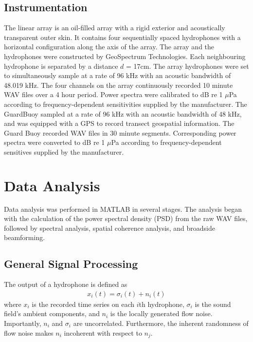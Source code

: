 \documentclass[12pt,journal,onecolumn]{IEEEtran}
\begin{document}
\subsection{Instrumentation}
The linear array is an oil-filled array with a rigid exterior and acoustically transparent outer skin. It contains four sequentially spaced hydrophones with a horizontal configuration along the axis of the array. The array and the hydrophones were constructed by GeoSpectrum Technologies. Each neighbouring hydrophone is separated by a distance $d$ = 17cm. The array hydrophones were set to simultaneously sample at a rate of 96 kHz with an acoustic bandwidth of 48.019 kHz.
The four channels on the array continuously recorded 10 minute WAV files over a 4 hour period. Power spectra were calibrated to dB re 1 $\mu$Pa according to frequency-dependent sensitivities supplied by the manufacturer. The GuardBuoy sampled at a rate of 96 kHz with an acoustic bandwidth of 48 kHz, and was equipped with a GPS to record transect geospatial information. The Guard Buoy recorded WAV files in 30 minute segments. Corresponding power spectra were converted to dB re 1 $\mu$Pa according to frequency-dependent sensitives supplied by the manufacturer. 







\section{Data Analysis}
\label{III}
Data analysis was performed in MATLAB in several stages. The analysis began with the calculation of the power spectral density (PSD) from the raw WAV files, followed by spectral analysis, spatial coherence analysis, and broadside beamforming. 



\subsection{General Signal Processing}

The output of a hydrophone is defined as
\begin{align}
x_i(t) = \sigma_i(t) + n_i (t) 
\label{output}
\end{align}
where $x_i$ is the recorded time series on each $i$th hydrophone, $\sigma_i$ is the sound field's ambient components, and $n_i$ is the locally generated flow noise. Importantly, $n_i$ and $\sigma_i$ are uncorrelated. 
Furthermore, the inherent randomness of flow noise makes $n_i$ incoherent with  respect to $n_j$. 
\end{document}
